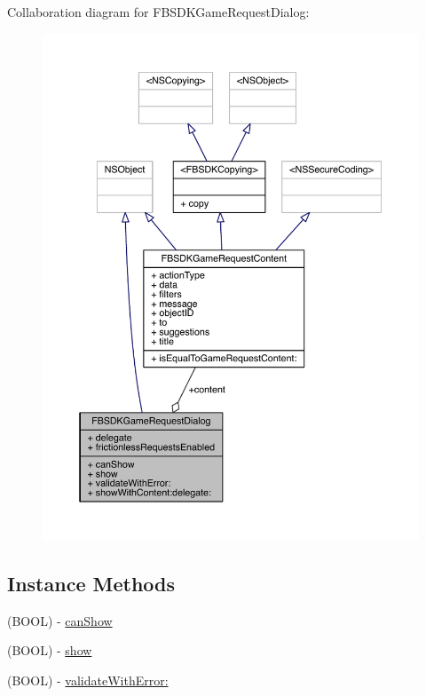 Collaboration diagram for F\-B\-S\-D\-K\-Game\-Request\-Dialog\-:
\nopagebreak
\begin{figure}[H]
\begin{center}
\leavevmode
\includegraphics[width=350pt]{interface_f_b_s_d_k_game_request_dialog__coll__graph}
\end{center}
\end{figure}
\subsection*{Instance Methods}
\begin{DoxyCompactItemize}
\item 
(B\-O\-O\-L) -\/ \hyperlink{interface_f_b_s_d_k_game_request_dialog_a12864871d0d4e6c9bb108a66144f8e1f}{can\-Show}
\item 
(B\-O\-O\-L) -\/ \hyperlink{interface_f_b_s_d_k_game_request_dialog_aa92ed48428c528e6bc2ebaa18793df0d}{show}
\item 
(B\-O\-O\-L) -\/ \hyperlink{interface_f_b_s_d_k_game_request_dialog_a7d32c3e433a913b18a768fc521315264}{validate\-With\-Error\-:}
\end{DoxyCompactItemize}
